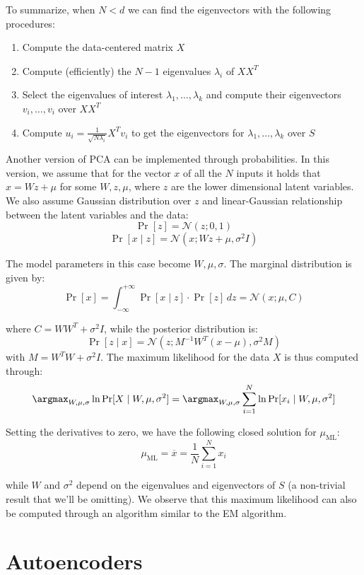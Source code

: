 \documentclass[a4paper, 12pt]{report}
\begin{document}
    To summarize, when $N < d$ we can find the eigenvectors with the following procedures:
    \begin{enumerate}
        \item Compute the data-centered matrix $X$
        \item Compute (efficiently) the $N-1$ eigenvalues $\lambda_i$ of $XX^T$
        \item Select the eigenvalues of interest $\lambda_1, \ldots, \lambda_k$ and compute their eigenvectors $v_i, \ldots, v_i$ over $XX^T$
        \item Compute $u_i = \frac{1}{\sqrt{N \lambda_i}} X^T v_i$ to get the eigenvectors for $\lambda_1, \ldots, \lambda_k$ over $S$
    \end{enumerate}

    Another version of PCA can be implemented through probabilities. In this version, we assume that for the vector $x$ of all the $N$ inputs it holds that $x = Wz + \mu$ for some $W,z, \mu$, where $z$ are the lower dimensional latent variables. We also assume Gaussian distribution over $z$ and linear-Gaussian relationship between the latent variables and the data:
    \[\Pr[z] = \mathcal{N}(z; 0,1)\]
    \[\Pr[x \mid z] = \mathcal{N}(x; Wz+\mu, \sigma^2I)\]

    The model parameters in this case become $W, \mu, \sigma$. The marginal distribution is given by:
    \[\Pr[x] = \int_{-\infty}^{+\infty} \Pr[x \mid z] \cdot \Pr[z] \, dz = \mathcal{N}(x; \mu, C)\]

    where $C = WW^T+\sigma^2I$, while the posterior distribution is:
    \[\Pr[z \mid x] = \mathcal{N}(z; M^{-1} W^T(x-\mu), \sigma^2M)\]
    with $M = W^TW+\sigma^2I$. The maximum likelihood for the data $X$ is thus computed through:
    \[\argmax_{W, \mu, \sigma} \ln \Pr[X \mid W, \mu, \sigma^2] = \argmax_{W, \mu, \sigma} \sum_{i = 1}^N \ln \Pr[x_i \mid W, \mu, \sigma^2]\]

    Setting the derivatives to zero, we have the following closed solution for $\mu_{\mathrm{ML}}$:
    \[\mu_{\mathrm{ML}} = \overline{x} = \frac{1}{N} \sum_{i = 1}^N x_i\]

    while $W$ and $\sigma^2$ depend on the eigenvalues and eigenvectors of $S$ (a non-trivial result that we'll be omitting). We observe that this maximum likelihood can also be computed through an algorithm similar to the EM algorithm. 

    \newpage

    \section{Autoencoders}
\end{document}
